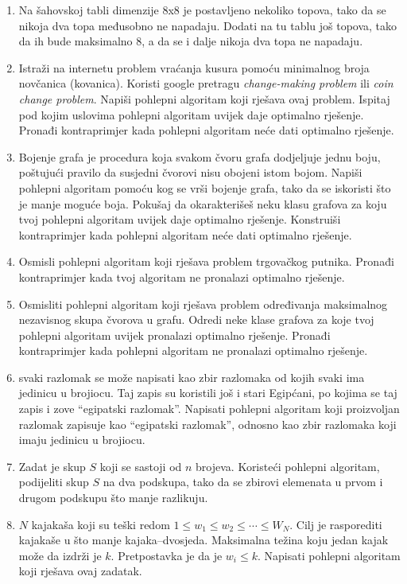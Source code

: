 \documentclass[a4paper, utf8, 11pt, colorlinks]{book}
\begin{document}
\begin{enumerate}
	\item Na šahovskoj tabli dimenzije 8x8 je postavljeno nekoliko topova, tako da se nikoja dva topa međusobno ne napadaju. Dodati na tu tablu još topova, tako da ih bude maksimalno 8, a da se i dalje nikoja dva topa ne napadaju.
	\item Istraži na internetu problem vraćanja kusura pomoću minimalnog broja novčanica (kovanica). Koristi google pretragu \textit{change-making problem} ili \textit{coin change problem}. Napiši pohlepni algoritam koji rješava ovaj problem. Ispitaj pod kojim uslovima pohlepni algoritam uvijek daje optimalno rješenje. Pronađi kontraprimjer kada pohlepni algoritam neće dati optimalno rješenje.
	\item Bojenje grafa je procedura koja svakom čvoru grafa dodjeljuje jednu boju, poštujući pravilo da susjedni čvorovi nisu obojeni istom bojom. Napiši pohlepni algoritam pomoću kog se vrši bojenje grafa, tako da se iskoristi što je manje moguće boja. Pokušaj da okarakterišeš neku klasu grafova za koju tvoj pohlepni algoritam uvijek daje optimalno rješenje. Konstruiši kontraprimjer kada pohlepni algoritam neće dati optimalno rješenje.
	
	\item Osmisli pohlepni algoritam koji rješava problem trgovačkog putnika. Pronađi kontraprimjer kada tvoj algoritam ne pronalazi optimalno rješenje.
	
	\item Osmisliti pohlepni algoritam koji rješava problem određivanja maksimalnog nezavisnog skupa čvorova u grafu. Odredi neke klase grafova za koje tvoj pohlepni algoritam uvijek pronalazi optimalno rješenje. Pronađi kontraprimjer kada pohlepni algoritam ne pronalazi optimalno rješenje.
	
	\item svaki razlomak se može napisati kao zbir razlomaka od kojih svaki ima jedinicu u brojiocu. Taj zapis su koristili još i stari Egipćani, po kojima se taj zapis i zove ``egipatski razlomak''. 
	Napisati pohlepni algoritam koji proizvoljan razlomak zapisuje kao ``egipatski razlomak'', odnosno kao zbir razlomaka koji imaju jedinicu u brojiocu.
	
	\item Zadat je skup $S$ koji se sastoji od $n$ brojeva. Koristeći pohlepni algoritam, podijeliti skup $S$ na dva podskupa, tako da se zbirovi elemenata u prvom i drugom podskupu što manje razlikuju.
	
	\item $N$ kajakaša koji su teški redom $1\leqslant w_1\leqslant w_2\leqslant \cdots \leqslant W_N$. Cilj je rasporediti kajakaše u što manje kajaka--dvosjeda. Maksimalna težina koju jedan kajak može da izdrži je $k$. Pretpostavka je da je $w_i\leqslant k$. Napisati pohlepni algoritam koji rješava ovaj zadatak.
	

\end{enumerate}
\end{document}
